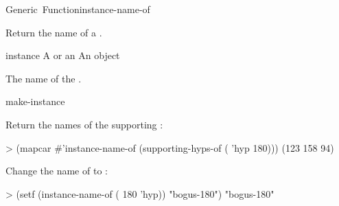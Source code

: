 \documentclass[10pt,twoside,english,pdftex]{article}
\begin{document}

\begin{functiondoc}{Generic~Function}{instance-name-of}{
    \returns{} }

\fnsyntax

\fnpurpose
Return the name of a .

\fnsetf
{}

\fnmethods
{}%
  {\code{(} 
  \returns{} }
%
  {\code{(} 
  \returns{} }

\fnpackage {}

\fnmodule {}

\fnargs
\begin{args}{instance}
\arg[instance] A  or an 
\arg[name] An object
\end{args}

\fnreturns The name of the .

\begin{alsos}{make-instance}
\end{alsos}

\fnexamples
{}%
Return the names of the  supporting
  :
\begin{example}
> (mapcar #'instance-name-of 
          (supporting-hyps-of ( 'hyp 180)))
(123 158 94)
\end{example}

%
Change the name of   to :
\begin{example}
> (setf (instance-name-of ( 180 'hyp)) "bogus-180")
"bogus-180"
\end{example}

\end{functiondoc}

\end{document}
